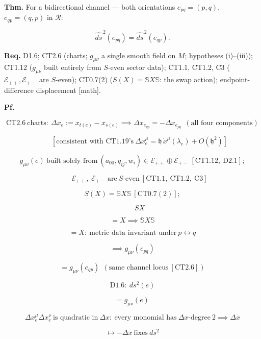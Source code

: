 \begin{theorem}\label{tag:FT-23}
\textbf{Thm.} For a bidirectional channel — both orientations $e_{pq}=(p,q)$, $e_{qp}=(q,p)$ in $\mathcal R$:

\[
\widehat{ds}^{\,2}(e_{pq})=\widehat{ds}^{\,2}(e_{qp}).
\]

\textbf{Req.} D1.6; CT2.6 (charts; $g_{\mu\nu}$ a single smooth field on $M$; hypotheses (i)–(iii)); CT1.12 ($g_{\mu\nu}$ built entirely from $S$-even sector data); CT1.1, CT1.2, C3 ($\mathcal E_{++},\mathcal E_{+-}$ are $S$-even); CT0.7(2) ($S(X)=\mathbb S X\mathbb S$: the swap action); endpoint-difference displacement [math].

\textbf{Pf.}

\[
\mathrm{CT2.6}\ \text{charts}:\ \Delta x_e:=x_{t(e)}-x_{s(e)}\implies\Delta x_{e_{qp}}=-\Delta x_{e_{pq}}\ \ (\text{all four components})
\]

\[
\qquad [\text{consistent with CT1.19's}\ \Delta x^\mu_e=\mathfrak h\,\dot x^\mu(\lambda_e)+O(\mathfrak h^2)]
\]

\[
g_{\mu\nu}(e)\ \text{built solely from}\ (a_{00},q_{ij},w_i)\in\mathcal E_{++}\oplus\mathcal E_{+-}\ [\mathrm{CT1.12},\ \mathrm{D2.1}];
\]

\[
\qquad \mathcal E_{++},\ \mathcal E_{+-}\ \text{are}\ S\text{-even}\ [\mathrm{CT1.1},\ \mathrm{CT1.2},\ \mathrm{C3}]
\]

\[
S(X)=\mathbb S X\mathbb S\ [\mathrm{CT0.7}(2)];
\]

\[
\qquad SX
\]

\[
= X\implies\mathbb S X\mathbb S
\]

\[
= X:\ \text{metric data invariant under}\ p\leftrightarrow q
\]

\[
\implies g_{\mu\nu}(e_{pq})
\]

\[
= g_{\mu\nu}(e_{qp})\ \ (\text{same channel locus}\ [\mathrm{CT2.6}])
\]

\[
\mathrm{D1.6}:\ ds^2(e)
\]

\[
= g_{\mu\nu}(e)\,
\]

\[
\Delta x^\mu_e\Delta x^\nu_e\ \text{is quadratic in}\ \Delta x:\ \text{every monomial has}\ \Delta x\text{-degree}\ 2\implies\Delta x
\]

\[
\mapsto -\Delta x\ \text{fixes}\ ds^2
\]


\end{theorem}
